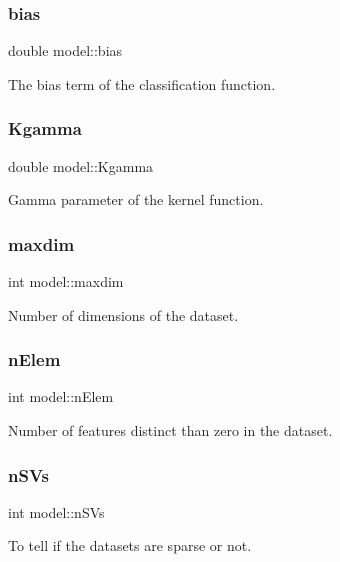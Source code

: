 \subsubsection{\texorpdfstring{bias}{bias}}
{\ttfamily double model\+::bias}

The bias term of the classification function. \hypertarget{structmodel_ac5c18eca6ad32bc6da1f2a923965e66c}{}\label{structmodel_ac5c18eca6ad32bc6da1f2a923965e66c} 
\subsubsection{\texorpdfstring{Kgamma}{Kgamma}}
{\ttfamily double model\+::\+Kgamma}

Gamma parameter of the kernel function. \hypertarget{structmodel_ac6ba8c1bc138143114cd331583f41387}{}\label{structmodel_ac6ba8c1bc138143114cd331583f41387} 
\subsubsection{\texorpdfstring{maxdim}{maxdim}}
{\ttfamily int model\+::maxdim}

Number of dimensions of the dataset. \hypertarget{structmodel_a4877089d41daf2186482e0e6f900d65f}{}\label{structmodel_a4877089d41daf2186482e0e6f900d65f} 
\subsubsection{\texorpdfstring{n\+Elem}{nElem}}
{\ttfamily int model\+::n\+Elem}

Number of features distinct than zero in the dataset. \hypertarget{structmodel_a3b73d79940bbdae365676c4fa56e96ea}{}\label{structmodel_a3b73d79940bbdae365676c4fa56e96ea} 
\subsubsection{\texorpdfstring{n\+S\+Vs}{nSVs}}
{\ttfamily int model\+::n\+S\+Vs}

To tell if the datasets are sparse or not. \hypertarget{structmodel_a623da3d1f5116fd4d66873b95eb2e720}{}\label{structmodel_a623da3d1f5116fd4d66873b95eb2e720} 
